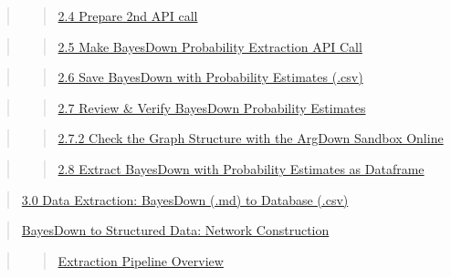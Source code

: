 \documentclass[
  letterpaper,
]{book}
\begin{document}
\begin{quote}
\begin{quote}
\hyperref[scrollTo=d4tB9WD-fIWZ]{2.4 Prepare 2nd API call}
\end{quote}
\end{quote}

\begin{quote}
\begin{quote}
\hyperref[scrollTo=oPWto83lfN9Q]{2.5 Make BayesDown Probability
Extraction API Call}
\end{quote}
\end{quote}

\begin{quote}
\begin{quote}
\hyperref[scrollTo=L8NWpz8MfZ9_]{2.6 Save BayesDown with Probability
Estimates (.csv)}
\end{quote}
\end{quote}

\begin{quote}
\begin{quote}
\hyperref[scrollTo=Q3PTtYgRfsLa]{2.7 Review \& Verify BayesDown
Probability Estimates}
\end{quote}
\end{quote}

\begin{quote}
\begin{quote}
\hyperref[scrollTo=VwoAgBsafonh]{2.7.2 Check the Graph Structure with
the ArgDown Sandbox Online}
\end{quote}
\end{quote}

\begin{quote}
\begin{quote}
\hyperref[scrollTo=19KDn2mKf309]{2.8 Extract BayesDown with Probability
Estimates as Dataframe}
\end{quote}
\end{quote}

\begin{quote}
\hyperref[scrollTo=vUSS00TCEpeW]{3.0 Data Extraction: BayesDown (.md) to
Database (.csv)}
\end{quote}

\begin{quote}
\hyperref[scrollTo=vUSS00TCEpeW]{BayesDown to Structured Data: Network
Construction}
\end{quote}

\begin{quote}
\begin{quote}
\hyperref[scrollTo=vUSS00TCEpeW]{Extraction Pipeline Overview}
\end{quote}
\end{quote}
\end{document}
